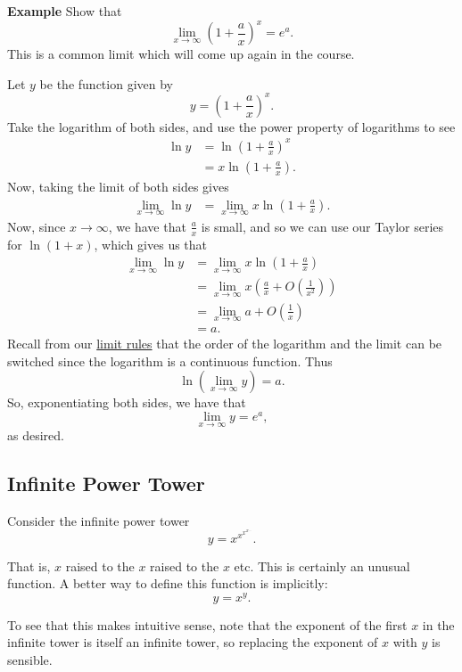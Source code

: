 \documentclass[twoside,openright,titlepage,a4paper]{book}
\begin{document}
\begin{sloppypar}
\textbf{Example} Show that \[ \lim_{x \rightarrow \infty} \left(1+\frac{a}{x}\right)^x = e^a. \]
This is a common limit which will come up again in the course.
\begin{examplebox}
Let $y$ be the function given by \[ y = \left(1+\frac{a}{x}\right)^x. \]
Take the logarithm of both sides, and use the power property of logarithms to see
\begin{align*}
\ln y &= \ln \left(1+\frac{a}{x}\right)^x \\
&= x \ln \left(1+\frac{a}{x}\right).
\end{align*}
Now, taking the limit of both sides gives
\begin{align*}
\lim_{x \rightarrow \infty} \ln y &= \lim_{x \rightarrow \infty} x \ln \left(1+\frac{a}{x}\right).
\end{align*}
Now, since $x \rightarrow \infty$, we have that $\frac{a}{x}$ is small, and so we can use our Taylor series for $\ln(1+x)$, which gives us that
\begin{align*}
\lim_{x \rightarrow \infty} \ln y &= \lim_{x \rightarrow \infty} x \ln\left(1+\frac{a}{x}\right) \\
&= \lim_{x \rightarrow \infty} x \left(\frac{a}{x} + O\left(\frac{1}{x^2}\right) \right) \\
&= \lim_{x \rightarrow \infty} a + O \left(\frac{1}{x}\right) \\
&= a.
\end{align*}
Recall from our \hyperref[ChFunctionsSecLimitsSubsecRulesForLimits]{limit rules} that the order of the logarithm and the limit can be switched since the logarithm is a continuous function. Thus \[ \ln \left(\lim_{x \rightarrow \infty} y \right) = a. \]
So, exponentiating both sides, we have that \[ \lim_{x\rightarrow \infty} y = e^a, \] as desired.	
\end{examplebox}

\subsection{Infinite Power Tower}

Consider the infinite power tower \[ y = x^{x^{x^{x^{\dotsb}}}}. \]

That is, $x$ raised to the $x$ raised to the $x$ etc. This is certainly an unusual function. A better way to define this function is implicitly: \[ y = x^y. \]

To see that this makes intuitive sense, note that the exponent of the first $x$ in the infinite tower is itself an infinite tower, so replacing the exponent of $x$ with $y$ is sensible.


\end{sloppypar}
\end{document}
